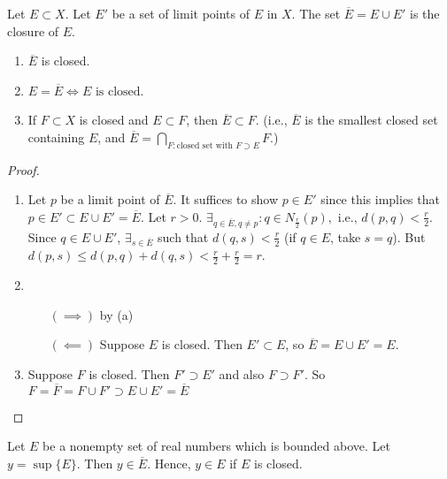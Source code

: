 \begin{definition}[Closure]
	Let $E \subset X$. Let $E'$ be a set of limit points of $E$ in $X$.
	The set $\overline{E}=E \cup E'$ is the closure of $E$.
\end{definition}
\begin{thm}[27]
	\label{thm:closure}
	\hfill
	\begin{enumerate}
		\item  $\overline{E}$ is closed.
		\item $E=\overline{E} \Leftrightarrow   \text{$E$ is closed}$.
		\item If $F \subset X$ is closed and $E \subset  F$, then $\overline{E} \subset F$. (i.e., $\overline{E}$ is the smallest closed set containing $E$, and $\overline{E}= \bigcap_{F:\text{closed set with $F \supset E$}} F$.)
	\end{enumerate}
	\begin{proof}
		\begin{enumerate}
			\item Let $p$ be a limit point of $\overline{E}$. It suffices to show $p \in E'$ since this implies that $p \in E' \subset E \cup E'=\overline{E}$.
			      Let $r>0$. $\exists_{q\in \overline{E}, q\neq p}: q \in N_{\frac{r}{2}}(p), \text{ i.e., } d(p,q) < \frac{r}{2}$. Since $q \in E \cup E'$, $\exists_{s \in \overline{E}}$ such that $d(q,s)<\frac{r}{2}$ (if $q \in E$, take $s=q$).
			      But $d(p,s) \le d(p,q)+d(q,s)<\frac{r}{2}+\frac{r}{2}=r$.
			\item
			      \begin{itemize}
				      \item[$(\implies)$] by (a)
				      \item[$(\impliedby)$] Suppose $E$ is closed. Then $E' \subset E$, so $\overline{E}=E \cup E'=E$.
			      \end{itemize}
			\item Suppose $F$ is closed. Then $F' \supset E'$ and also $F \supset F'$. So $F=\overline{F}=F \cup F' \supset E \cup E'=\overline{E}$
		\end{enumerate}

	\end{proof}
\end{thm}

\begin{theorem}[28]
	Let $E$ be a nonempty set of real numbers which is bounded above. Let $y=\sup\{E\}$. Then $y \in \overline{E}$. Hence, $y \in E$ if $E$ is closed.
\end{theorem}

